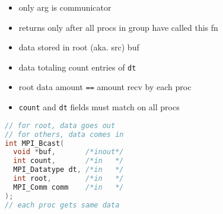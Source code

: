 \begin{minipage}{0.5\linewidth}
  \flushleft
  \begin{itemize}
  \item only arg is communicator
  \item returns only after all procs in group have called this fn
  \item data stored in root (aka. src) buf
  \item data totaling count entries of \texttt{dt}
  \item root data amount \texttt{==} amount recv by each proc
  \item \texttt{count} and \texttt{dt} fields must match on all procs
  \end{itemize}
\end{minipage}
\begin{minipage}{0.5\linewidth}
\begin{lstlisting}[language=c,xleftmargin=1pt]
// for root, data goes out
// for others, data comes in
int MPI_Bcast(
  void *buf,       /*inout*/
  int count,       /*in   */
  MPI_Datatype dt, /*in   */
  int root,        /*in   */
  MPI_Comm comm    /*in   */
);
// each proc gets same data
\end{lstlisting}
\end{minipage}
